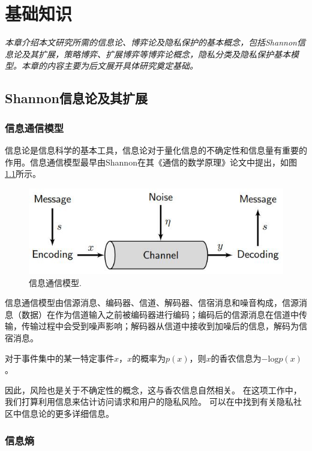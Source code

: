 \chapter{基础知识}
\label{chap:preliminary}

\textit{本章介绍本文研究所需的信息论、博弈论及隐私保护的基本概念，包括Shannon信息论及其扩展，策略博弈、扩展博弈等博弈论概念，隐私分类及隐私保护基本模型。本章的内容主要为后文展开具体研究奠定基础。}
\section{Shannon信息论及其扩展}

\subsection{信息通信模型}
信息论\cite{shannon1948mathematical,
	stone2018information}是信息科学的基本工具，信息论对于量化信息的不确定性和信息量有重要的作用。信息通信模型最早由Shannon在其《通信的数学原理》论文中提出，如图\ref{fig:communication-model}所示。

\begin{figure}[htbp]
	\centering
	\includegraphics[width = 0.6\linewidth]{./figures/shannon-communicaiton-model.jpg}
	\caption{信息通信模型\cite{stone2018information}.
	}
	\label{fig:communication-model}
\end{figure}

信息通信模型\cite{stone2018information}由信源消息、编码器、信道、解码器、信宿消息和噪音构成，信源消息（数据）在作为信道输入之前被编码器进行编码；编码后的信源消息在信道中传输，传输过程中会受到噪声影响；解码器从信道中接收到加噪后的信息，解码为信宿消息。



对于事件集中的某一特定事件$x$，$x$的概率为$p(x)$，则$x$的香农信息为$-\text{log}p(x)$。

因此，风险也是关于不确定性的概念，这与香农信息自然相关。 在这项工作中，我们打算利用信息来估计访问请求和用户的隐私风险。 可以在\cite{wagner2018}中找到有关隐私社区中信息论的更多详细信息。

\subsection{信息熵}







